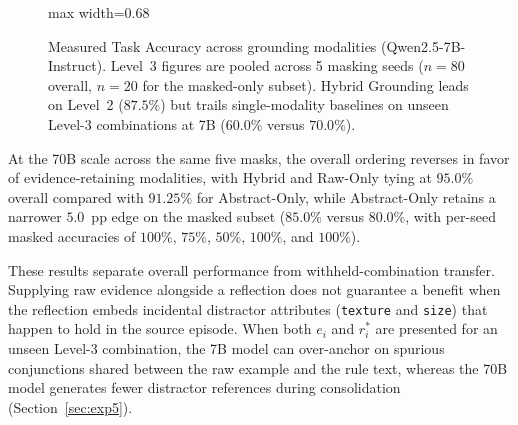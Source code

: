 \documentclass[10pt,a4paper,onecolumn]{article}
\theoremstyle{definition}
\theoremstyle{remark}
\begin{document}
\begin{figure}[!t]
    \centering
    \begin{adjustbox}{max width=0.68\linewidth}\end{adjustbox}
    \caption{Measured Task Accuracy across grounding modalities (Qwen2.5-7B-Instruct). Level~3 figures are pooled across 5 masking seeds ($n=80$ overall, $n=20$ for the masked-only subset). Hybrid Grounding leads on Level~2 ($87.5\%$) but trails single-modality baselines on unseen Level-3 combinations at 7B ($60.0\%$ versus $70.0\%$).}
    \label{fig:exp2_ablation}
\end{figure}

At the 70B scale across the same five masks, the overall ordering reverses in favor of evidence-retaining modalities, with Hybrid and Raw-Only tying at $95.0\%$ overall compared with $91.25\%$ for Abstract-Only, while Abstract-Only retains a narrower $5.0$~pp edge on the masked subset ($85.0\%$ versus $80.0\%$, with per-seed masked accuracies of $100\%$, $75\%$, $50\%$, $100\%$, and $100\%$).

These results separate overall performance from withheld-combination transfer. Supplying raw evidence alongside a reflection does not guarantee a benefit when the reflection embeds incidental distractor attributes (\texttt{texture} and \texttt{size}) that happen to hold in the source episode. When both $e_i$ and $r_i^*$ are presented for an unseen Level-3 combination, the 7B model can over-anchor on spurious conjunctions shared between the raw example and the rule text, whereas the 70B model generates fewer distractor references during consolidation (Section~\ref{sec:exp5}).
\end{document}
